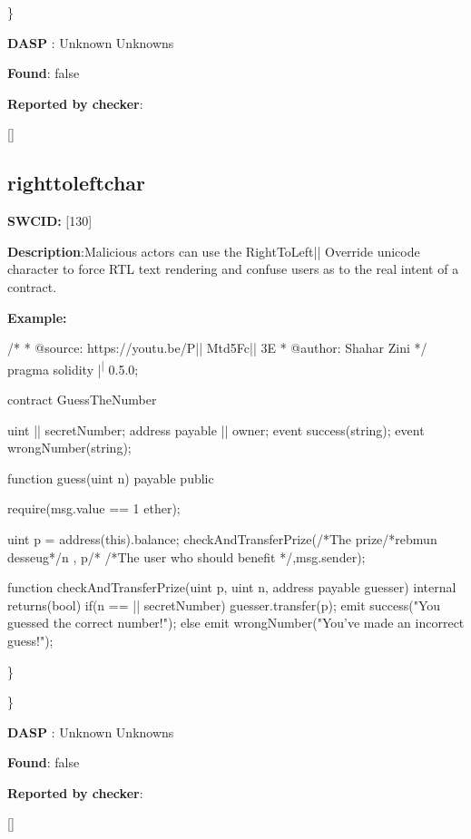 \documentclass{article}
\begin{document}
\} 

\textbf{DASP} : Unknown Unknowns

\textbf{Found}: false

\textbf{Reported by checker}: 
\begin{ffcode} 

[]
\end{ffcode} 
\subsection{right{\textunderscore}to{\textunderscore}left{\textunderscore}char} 
\textbf{SWC{\textunderscore}ID:} [130]

\textbf{Description}:Malicious actors can use the Right{\textendash}To{\textendash}Left|\textendash| Override unicode character to force RTL text rendering and confuse users as to the real intent of a contract.


\textbf{Example:} 
\begin{ffcode} 

/*
* @source: https://youtu.be/P|\textunderscore| Mtd5Fc|\textunderscore| 3E
* @author: Shahar Zini
*/
pragma solidity |\textsuperscript| 0.5.0;

contract GuessTheNumber
{
    uint |\textunderscore| secretNumber;
    address payable |\textunderscore| owner;
    event success(string);
event wrongNumber(string);

    function guess(uint n) payable public
    {
        require(msg.value == 1 ether);

        uint p = address(this).balance;
        checkAndTransferPrize(/*The prize/*rebmun desseug*/n , p/*
                /*The user who should benefit */,msg.sender);
    }

    function checkAndTransferPrize(uint p, uint n, address payable guesser) internal returns(bool)
    {
        if(n == |\textunderscore| secretNumber)
        {
            guesser.transfer(p);
            emit success("You guessed the correct number!");
        }
        else
        {
            emit wrongNumber("You've made an incorrect guess!");
        }
    }
  }

\end{ffcode} 
\} 

\} 

\textbf{DASP} : Unknown Unknowns

\textbf{Found}: false

\textbf{Reported by checker}: 
\begin{ffcode} 

[]
\end{ffcode} 
\end{document}
